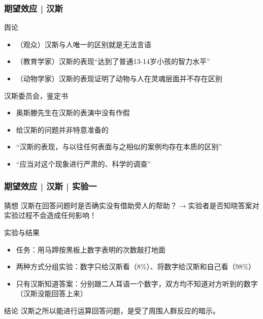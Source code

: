 \begin{frame}
  \frametitle{期望效应 | 汉斯}
  \begin{block}{舆论}
    \begin{itemize}
      \item （观众）汉斯与人唯一的区别就是无法言语
      \item （教育学家）汉斯的表现“达到了普通13-14岁小孩的智力水平”
      \item （动物学家）汉斯的表现证明了动物与人在灵魂层面并不存在区别
    \end{itemize}
  \end{block}
  \pause
  \begin{block}{汉斯委员会，鉴定书}
    \begin{itemize}
      \item 奥斯滕先生在汉斯的表演中没有作假
      \item 给汉斯的问题并非特意准备的
      \item “汉斯的表现，与以往任何表面与之相似的案例均存在本质的区别”
      \item “应当对这个现象进行严肃的、科学的调查”
    \end{itemize}
  \end{block}
\end{frame}

\begin{frame}
  \frametitle{期望效应 | 汉斯 | 实验一}
  \begin{block}{猜想}
  汉斯在回答问题时是否确实没有借助旁人的帮助？$\longrightarrow$实验者是否知晓答案对实验过程不会造成任何影响！
  \end{block}
  \pause
  \begin{block}{实验与结果}
    \begin{itemize}
      \item 任务：用马蹄按黑板上数字表明的次数敲打地面
      \item 两种方式分组实验：数字只给汉斯看（8\%）、将数字给汉斯和自己看（98\%）
      \item 只有汉斯知道答案：分别跟二人耳语一个数字，双方均不知道对方听到的数字（汉斯没能回答上来）
    \end{itemize}
  \end{block}
  \pause
  \begin{block}{结论}
    汉斯之所以能进行运算回答问题，是受了周围人群反应的暗示。
  \end{block}
\end{frame}

